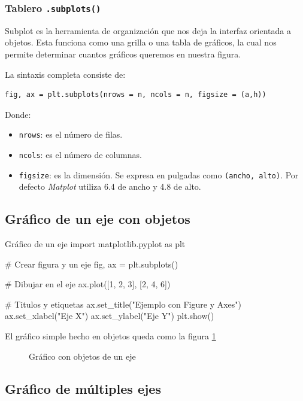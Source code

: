 \subsubsection{Tablero \texttt{.subplots()}}

Subplot es la herramienta de organización que nos deja la interfaz orientada a objetos. Esta funciona como una grilla o una tabla de gráficos, la cual nos permite determinar cuantos gráficos queremos en nuestra figura.

La sintaxis completa consiste de:
\begin{verbatim}
fig, ax = plt.subplots(nrows = n, ncols = n, figsize = (a,h))
\end{verbatim}

Donde:
\begin{itemize}
    \item \texttt{nrows}: es el número de filas.
    \item \texttt{ncols}: es el número de columnas.
    \item \texttt{figsize}: es la dimensión. Se expresa en pulgadas como \texttt{(ancho, alto)}. Por defecto \textit{Matplot} utiliza 6.4 de ancho y 4.8 de alto.
\end{itemize}

\subsection{Gráfico de un eje con objetos}

\begin{pycode}{Gráfico de un eje}
import matplotlib.pyplot as plt

# Crear figura y un eje
fig, ax = plt.subplots()

# Dibujar en el eje
ax.plot([1, 2, 3], [2, 4, 6])

# Titulos y etiquetas
ax.set_title("Ejemplo con Figure y Axes")
ax.set_xlabel("Eje X")
ax.set_ylabel("Eje Y")
plt.show()    
\end{pycode}

El gráfico simple hecho en objetos queda como la figura \ref{fig:grafico_objeto_1eje}

\begin{figure}[ht]
    \centering
     
    \caption{Gráfico con objetos de un eje}
    \label{fig:grafico_objeto_1eje}
\end{figure}

\subsection{Gráfico de múltiples ejes}

